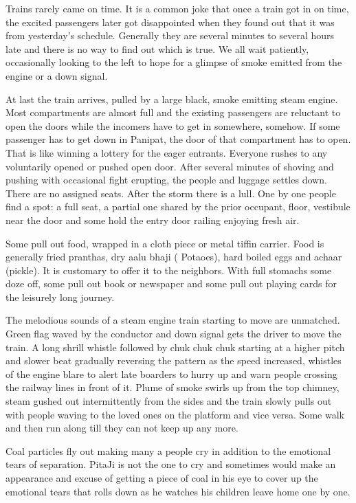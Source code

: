 Trains rarely came on time. It is a common joke that once a train got in
on time, the excited passengers later got disappointed when they found out
that it was from yesterday's schedule. Generally they are several minutes
to several hours late and there is no way to find out which is true. We
all wait patiently, occasionally looking to the left to hope for a glimpse
of smoke emitted from the engine or a down signal.

At last the train arrives, pulled by a large black, smoke emitting steam
engine. Most compartments are almost full and the existing passengers are
reluctant to open the doors while the incomers have to get in somewhere,
somehow. If some passenger has to get down in Panipat, the door of that
compartment has to open. That is like winning a lottery for the eager
entrants. Everyone rushes to any voluntarily opened or pushed open door.
After several minutes of shoving and pushing with occasional fight
erupting, the people and luggage settles down. There are no assigned
seats. After the storm there is a lull. One by one people find a spot:
a full seat, a partial one shared by the prior occupant, floor, vestibule
near the door and some hold the entry door railing enjoying fresh air.

Some pull out food, wrapped in a cloth piece or metal tiffin carrier. Food
is generally fried pranthas, dry aalu bhaji ( Potaoes), hard boiled eggs
and achaar (pickle). It is customary to offer it to the neighbors. With
full stomachs some doze off, some pull out book or newspaper and some pull
out playing cards for the leisurely long journey.

The melodious sounds of a steam engine train starting to move are
unmatched. Green flag waved by the conductor and down signal gets the
driver to move the train. A long shrill whistle followed by chuk chuk chuk
starting at a higher pitch and slower beat gradually reversing the pattern
as the speed increased, whistles of the engine blare to alert late
boarders to hurry up and warn people crossing the railway lines in front
of it. Plume of smoke swirls up from the top chimney, steam gushed out
intermittently from the sides and the train slowly pulls out with people
waving to the loved ones on the platform and vice versa. Some walk and
then run along till they can not keep up any more.

Coal particles fly out making many a people cry in addition to the
emotional tears of separation. PitaJi is not the one to cry and sometimes
would make an appearance and excuse of getting a piece of coal in his eye
to cover up the emotional tears that rolls down as he watches his children
leave home one by one.

